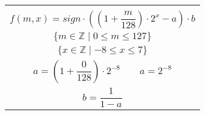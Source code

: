 \documentclass[12pt]{standalone}
\begin{document}
    \begin{minipage}{9cm}

        \begin{tabular}{|c|}
        \hline
        \\

            \vbox{\begin{equation*}
            f(m, x) = sign \cdot ((1 + \frac{m}{128}) \cdot 2^{x} - a) \cdot b
            \end{equation*}}

        \\

            \vbox{\begin{equation*}
            \{ m \in \mathbb{Z} \mid 0 \leq m \leq 127 \}
            \end{equation*}}

        \\

            \vbox{\begin{equation*}
            \{ x \in \mathbb{Z} \mid -8 \leq x \leq 7 \}
            \end{equation*}}

        \\

            \vbox{\begin{equation*}
            a = (1 + \frac{0}{128}) \cdot 2^{-8}
            \quad \quad
            a = 2^{-8}
            \end{equation*}}

        \\

            \vbox{\begin{equation*}
            b = \frac{1}{1 - a}
            \end{equation*}}

        \\
        \hline
        \end{tabular}

    \end{minipage}
\end{document}
